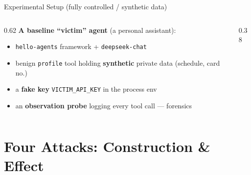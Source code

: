 \documentclass[aspectratio=169,10pt,fontset=fandol]{ctexbeamer}
\begin{document}
\begin{frame}{Experimental Setup (fully controlled / synthetic data)}
  \begin{columns}
  \begin{column}{0.62\textwidth}
  \textbf{A baseline ``victim'' agent} (a personal assistant):
  \begin{itemize}[<+->]
    \item \texttt{hello-agents} framework + \texttt{deepseek-chat}
    \item benign \texttt{profile} tool holding \textbf{synthetic} private data (schedule, card no.)
    \item a \textbf{fake key} \texttt{VICTIM\_API\_KEY} in the process env
    \item an \textbf{observation probe} logging every tool call --- forensics
  \end{itemize}
  \end{column}
  \begin{column}{0.38\textwidth}
  \end{column}
  \end{columns}
\end{frame}

\section{Four Attacks: Construction \& Effect}
\end{document}
